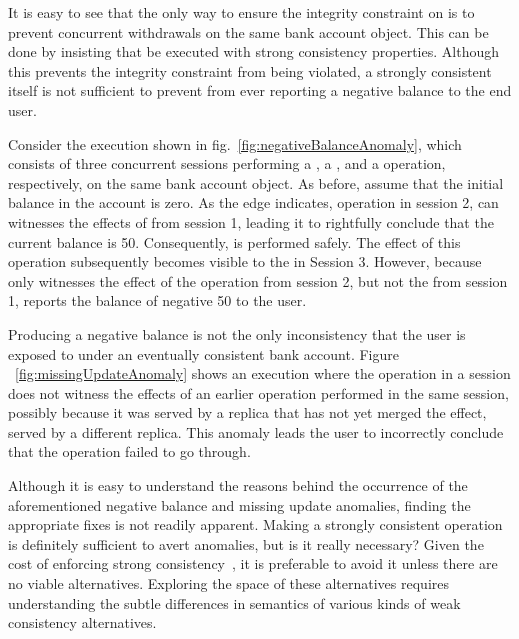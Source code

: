 It is easy to see that the only way to ensure the integrity constraint on
 is to prevent concurrent withdrawals on the same bank account
object. This can be done by insisting that  be executed with
strong consistency properties. Although this prevents the integrity constraint
from being violated, a strongly consistent  itself is not
sufficient to prevent  from ever reporting a negative balance to
the end user.

Consider the execution shown in fig.~\ref{fig:negativeBalanceAnomaly}, which
consists of three concurrent sessions performing a , a
, and a  operation, respectively, on the same bank
account object. As before, assume that the initial balance in the account is
zero. As the  edge indicates, operation  in session 2,
can witnesses the effects of  from session 1, leading it to
rightfully conclude that the current balance is 50. Consequently,
 is performed safely. The effect of this 
operation subsequently becomes visible to the  in Session 3.
However, because  only witnesses the effect of the 
operation from session 2, but not the  from session 1, reports the
balance of negative 50 to the user.

Producing a negative balance is not the only inconsistency that the user is
exposed to under an eventually consistent bank account. Figure
~\ref{fig:missingUpdateAnomaly} shows an execution where the 
operation in a session does not witness the effects of an earlier 
operation performed in the same session, possibly because it was served by a
replica that has not yet merged the  effect, served by a different
 replica. This anomaly leads the user to incorrectly conclude that the
 operation failed to go through.

Although it is easy to understand the reasons behind the occurrence of the
aforementioned negative balance and missing update anomalies, finding the
appropriate fixes is not readily apparent. Making  a strongly
consistent operation is definitely sufficient to avert anomalies, but is it
really necessary? Given the cost of enforcing strong
consistency~\cite{DynamoDB, Pileus}, it is preferable to avoid it unless
there are no viable alternatives.  Exploring the space of these alternatives
requires understanding the subtle differences in semantics of various kinds
of weak consistency alternatives.

